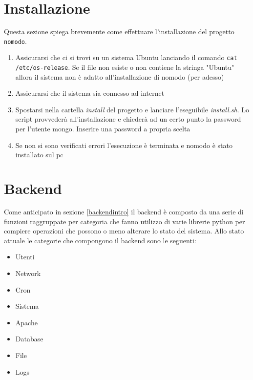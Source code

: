 \documentclass[11pt]{article}
\begin{document}
\section{Installazione}\label{install}
Questa sezione spiega brevemente come effettuare l'installazione del progetto \texttt{nomodo}.
\begin{enumerate}
		\item{Assicurarsi che ci si trovi su un sistema Ubuntu lanciando il comando \texttt{cat /etc/os-release}.
			Se il file non esiste o non contiene la stringa "Ubuntu" allora il sistema non è adatto
			all'installazione di nomodo (per adesso)}
		\item{Assicurarsi che il sistema sia connesso ad internet}
		\item{Spostarsi nella cartella \textit{install} del progetto e lanciare l'eseguibile \textit{install.sh}.
			Lo script provvederà all'installazione e chiederà ad un certo punto la password per l'utente mongo.
			Inserire una password a propria scelta}
		\item{Se non si sono verificati errori l'esecuzione è terminata e nomodo è stato installato sul pc}
\end{enumerate}

\section{Backend}\label{backend}
Come anticipato in sezione \ref{backendintro} il backend è composto da una serie di funzioni raggruppate per categoria
che fanno utilizzo di varie librerie python per compiere operazioni che possono o meno alterare lo stato del sistema.
Allo stato attuale le categorie che compongono il backend sono le seguenti:
\begin{itemize}
	\item{Utenti}
	\item{Network}
	\item{Cron}
	\item{Sistema}
	\item{Apache}
	\item{Database}
	\item{File}
	\item{Logs}
\end{itemize}
\end{document}
